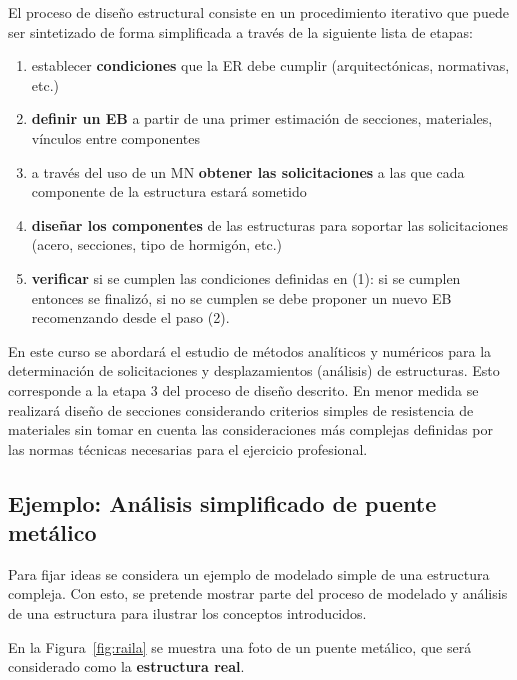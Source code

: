 El proceso de diseño estructural consiste en un procedimiento iterativo que puede ser sintetizado de forma simplificada a través de la siguiente lista de etapas:
%
\begin{enumerate}
  \item establecer \textbf{condiciones} que la ER debe cumplir (arquitectónicas, normativas, etc.)
  \item \textbf{definir un EB} a partir de una primer estimación de secciones, materiales, vínculos entre componentes
  \item a través del uso de un MN \textbf{obtener las solicitaciones} a las que cada componente de la estructura estará sometido
  \item \textbf{diseñar los componentes} de las estructuras para soportar las solicitaciones (acero, secciones, tipo de hormigón, etc.) 
  \item \textbf{verificar} si se cumplen las condiciones definidas en (1): si se cumplen entonces se finalizó, si no se cumplen se debe proponer un nuevo EB recomenzando desde el paso (2).
\end{enumerate}


En este curso se abordará el estudio de métodos analíticos y numéricos para la determinación de solicitaciones y desplazamientos (análisis) de estructuras. %
Esto corresponde a la etapa 3 del proceso de diseño descrito. %
%
En menor medida se realizará diseño de secciones considerando criterios simples de resistencia de materiales sin tomar en cuenta las consideraciones más complejas definidas por las normas técnicas necesarias para el ejercicio profesional. %
%
%

\subsection{Ejemplo: Análisis simplificado de puente metálico}

Para fijar ideas se considera un ejemplo de modelado simple de una estructura compleja. %
%
Con esto, se pretende mostrar parte del proceso de modelado y análisis de una estructura para ilustrar los conceptos introducidos.

En la Figura~\ref{fig:raila} se muestra una foto de un puente metálico, que será considerado como la \textbf{estructura real}. %

